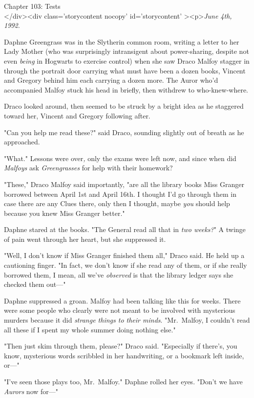 
Chapter 103: Tests\\
</div><div  class='storycontent nocopy' id='storycontent' ><p>\emph{June 4th, 
1992.}

Daphne Greengrass was in the Slytherin common room, writing a letter to her 
Lady Mother (who was surprisingly intransigent about power-sharing, despite not 
even \emph{being} in Hogwarts to exercise control) when she saw Draco Malfoy 
stagger in through the portrait door carrying what must have been a dozen 
books, Vincent and Gregory behind him each carrying a dozen more. The Auror 
who'd accompanied Malfoy stuck his head in briefly, then withdrew to 
who-knew-where.

Draco looked around, then seemed to be struck by a bright idea as he staggered 
toward her, Vincent and Gregory following after.

"Can you help me read these?" said Draco, sounding slightly out of breath as he 
approached.

"What." Lessons were over\emph{,} only the exams were left now, and since when 
did \emph{Malfoys} ask \emph{Greengrasses} for help with their homework?

"These," Draco Malfoy said importantly, "are all the library books Miss Granger 
borrowed between April 1st and April 16th. I thought I'd go through them in 
case there are any Clues there, only then I thought, maybe \emph{you} should 
help because you knew Miss Granger better."

Daphne stared at the books. "The General read all that in \emph{two weeks?}" A 
twinge of pain went through her heart, but she suppressed it.

"Well, I don't know if Miss Granger finished them all," Draco said. He held up 
a cautioning finger. "In fact, we don't know if she read any of them, or if she 
really borrowed them, I mean, all we've \emph{observed} is that the library 
ledger says she checked them out---"

Daphne suppressed a groan. Malfoy had been talking like this for weeks. There 
were some people who clearly were not meant to be involved with mysterious 
murders because it did \emph{strange things to their minds}. "Mr.~Malfoy, I 
couldn't read all these if I spent my whole summer doing nothing else."

"Then just skim through them, please?" Draco said. "Especially if there's, you 
know, mysterious words scribbled in her handwriting, or a bookmark left inside, 
or---"

"I've seen those plays too, Mr.~Malfoy." Daphne rolled her eyes. "Don't we have 
\emph{Aurors} now for---"

